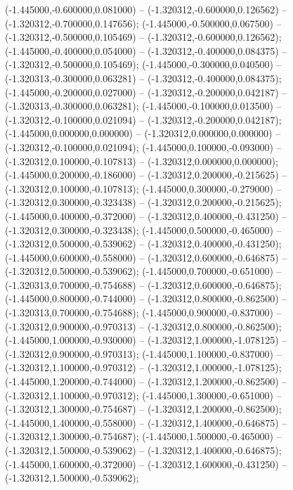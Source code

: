  (-1.445000,-0.600000,0.081000) -- (-1.320312,-0.600000,0.126562) -- (-1.320312,-0.700000,0.147656);
 (-1.445000,-0.500000,0.067500) -- (-1.320312,-0.500000,0.105469) -- (-1.320312,-0.600000,0.126562);
 (-1.445000,-0.400000,0.054000) -- (-1.320312,-0.400000,0.084375) -- (-1.320312,-0.500000,0.105469);
 (-1.445000,-0.300000,0.040500) -- (-1.320313,-0.300000,0.063281) -- (-1.320312,-0.400000,0.084375);
 (-1.445000,-0.200000,0.027000) -- (-1.320312,-0.200000,0.042187) -- (-1.320313,-0.300000,0.063281);
 (-1.445000,-0.100000,0.013500) -- (-1.320312,-0.100000,0.021094) -- (-1.320312,-0.200000,0.042187);
 (-1.445000,0.000000,0.000000) -- (-1.320312,0.000000,0.000000) -- (-1.320312,-0.100000,0.021094);
 (-1.445000,0.100000,-0.093000) -- (-1.320312,0.100000,-0.107813) -- (-1.320312,0.000000,0.000000);
 (-1.445000,0.200000,-0.186000) -- (-1.320312,0.200000,-0.215625) -- (-1.320312,0.100000,-0.107813);
 (-1.445000,0.300000,-0.279000) -- (-1.320312,0.300000,-0.323438) -- (-1.320312,0.200000,-0.215625);
 (-1.445000,0.400000,-0.372000) -- (-1.320312,0.400000,-0.431250) -- (-1.320312,0.300000,-0.323438);
 (-1.445000,0.500000,-0.465000) -- (-1.320312,0.500000,-0.539062) -- (-1.320312,0.400000,-0.431250);
 (-1.445000,0.600000,-0.558000) -- (-1.320312,0.600000,-0.646875) -- (-1.320312,0.500000,-0.539062);
 (-1.445000,0.700000,-0.651000) -- (-1.320313,0.700000,-0.754688) -- (-1.320312,0.600000,-0.646875);
 (-1.445000,0.800000,-0.744000) -- (-1.320312,0.800000,-0.862500) -- (-1.320313,0.700000,-0.754688);
 (-1.445000,0.900000,-0.837000) -- (-1.320312,0.900000,-0.970313) -- (-1.320312,0.800000,-0.862500);
 (-1.445000,1.000000,-0.930000) -- (-1.320312,1.000000,-1.078125) -- (-1.320312,0.900000,-0.970313);
 (-1.445000,1.100000,-0.837000) -- (-1.320312,1.100000,-0.970312) -- (-1.320312,1.000000,-1.078125);
 (-1.445000,1.200000,-0.744000) -- (-1.320312,1.200000,-0.862500) -- (-1.320312,1.100000,-0.970312);
 (-1.445000,1.300000,-0.651000) -- (-1.320312,1.300000,-0.754687) -- (-1.320312,1.200000,-0.862500);
 (-1.445000,1.400000,-0.558000) -- (-1.320312,1.400000,-0.646875) -- (-1.320312,1.300000,-0.754687);
 (-1.445000,1.500000,-0.465000) -- (-1.320312,1.500000,-0.539062) -- (-1.320312,1.400000,-0.646875);
 (-1.445000,1.600000,-0.372000) -- (-1.320312,1.600000,-0.431250) -- (-1.320312,1.500000,-0.539062);
